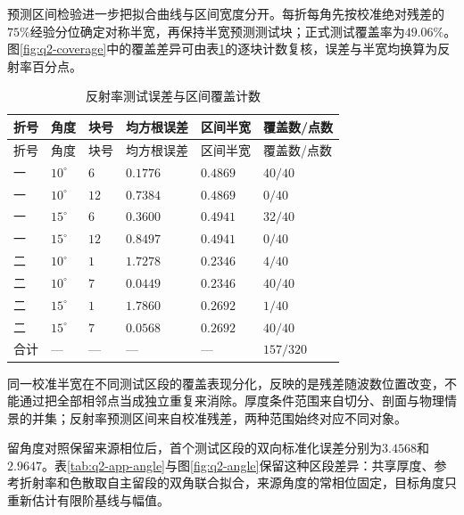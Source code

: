 预测区间检验进一步把拟合曲线与区间宽度分开。每折每角先按校准绝对残差的$75\%$经验分位确定对称半宽，再保持半宽预测测试块；正式测试覆盖率为$49.06\%$。图\ref{fig:q2-coverage}中的覆盖差异可由表\ref{tab:q2-app-coverage}的逐块计数复核，误差与半宽均换算为反射率百分点。

\begingroup
\small
\renewcommand{\arraystretch}{1.15}
\begin{longtable}{>{\centering\arraybackslash}p{}>{\centering\arraybackslash}p{}>{\centering\arraybackslash}p{}>{\centering\arraybackslash}p{}>{\centering\arraybackslash}p{}>{\centering\arraybackslash}p{}}
\caption{反射率测试误差与区间覆盖计数}\label{tab:q2-app-coverage}\\
\toprule
折号 & 角度 & 块号 & 均方根误差 & 区间半宽 & 覆盖数/点数 \\
\midrule
\endfirsthead
\toprule
折号 & 角度 & 块号 & 均方根误差 & 区间半宽 & 覆盖数/点数 \\
\midrule
\endhead
\bottomrule
\endfoot
一 & $10^\circ$ & $6$ & $0.1776$ & $0.4869$ & $40/40$ \\
一 & $10^\circ$ & $12$ & $0.7384$ & $0.4869$ & $0/40$ \\
一 & $15^\circ$ & $6$ & $0.3600$ & $0.4941$ & $32/40$ \\
一 & $15^\circ$ & $12$ & $0.8497$ & $0.4941$ & $0/40$ \\
二 & $10^\circ$ & $1$ & $1.7278$ & $0.2346$ & $4/40$ \\
二 & $10^\circ$ & $7$ & $0.0449$ & $0.2346$ & $40/40$ \\
二 & $15^\circ$ & $1$ & $1.7860$ & $0.2692$ & $1/40$ \\
二 & $15^\circ$ & $7$ & $0.0568$ & $0.2692$ & $40/40$ \\
合计 & --- & --- & --- & --- & $157/320$ \\
\end{longtable}
\endgroup

同一校准半宽在不同测试区段的覆盖表现分化，反映的是残差随波数位置改变，不能通过把全部相邻点当成独立重复来消除。厚度条件范围来自切分、剖面与物理情景的并集；反射率预测区间来自校准残差，两种范围始终对应不同对象。

留角度对照保留来源相位后，首个测试区段的双向标准化误差分别为$3.4568$和$2.9647$。表\ref{tab:q2-app-angle}与图\ref{fig:q2-angle}保留这种区段差异：共享厚度、参考折射率和色散取自主留段的双角联合拟合，来源角度的常相位固定，目标角度只重新估计有限阶基线与幅值。

